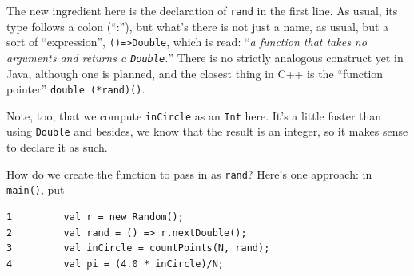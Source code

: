 The new ingredient here is the declaration of {\tt rand} in the first line.
As usual, its type follows
a colon (``:''), but what's there is not just a name, as usual, but a sort
of ``expression'', 
{\tt ()=>Double}, which is read:
``{\em a function that takes no arguments and returns a {\tt Double}.}''
There is no strictly analogous construct yet in Java, although one is planned, 
and the closest thing in C++ is the ``function pointer'' {\tt double (*rand)()}.

Note, too, that we compute {\tt inCircle} as an {\tt Int} here.  It's a little
faster than using {\tt Double} and besides, we know that the result is an
integer, so it makes sense to declare it as such.  

How do we create the function to pass in as {\tt rand}?  Here's one approach: in
{\tt main()}, put
\begin{verbatim}
1         val r = new Random();              
2         val rand = () => r.nextDouble();   
3         val inCircle = countPoints(N, rand); 
4         val pi = (4.0 * inCircle)/N;       
\end{verbatim}
 
